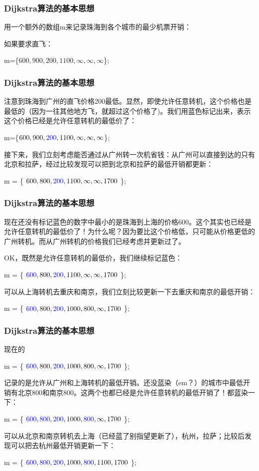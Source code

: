 \documentclass[CJK,14pt]{beamer}
\begin{document}
  \begin{frame}
    \frametitle{Dijkstra算法的基本思想}
    用一个额外的数组m来记录珠海到各个城市的最少机票开销：

    如果要求直飞：

    m=\{$600,900,200,1100,\infty,\infty,\infty$\};

      
    
  \end{frame}


  \begin{frame}
    \frametitle{Dijkstra算法的基本思想}
    注意到珠海到广州的直飞价格200最低。显然，即使允许任意转机，这个价格也是最低的（因为一往其他地方飞，就超过这个价格了)。我们用蓝色标记出来，表示这个价格已经是允许任意转机的最低价了：

    m=\{$600,900,{\color{blue} 200},1100,\infty,\infty,\infty$\};      

    接下来，我们立刻考虑能否通过从广州转一次机省钱：从广州可以直接到达的只有北京和拉萨，经过比较发现可以把到北京和拉萨的最低开销都更新：

    m = \{ $600, 800, {\color{blue} 200}, 1100, \infty, \infty, 1700$ \};

      
    
  \end{frame}


  \begin{frame}
    \frametitle{Dijkstra算法的基本思想}
    现在还没有标记蓝色的数字中最小的是珠海到上海的价格600。这个其实也已经是允许任意转机的最低价了！为什么呢？因为要比这个价格低，只可能从价格更低的广州转机。而从广州转机的价格我们已经考虑并更新过了。

    OK，既然是允许任意转机的最低价，我们继续标记蓝色：
    

    m = \{ ${\color{blue} 600}, 800, {\color{blue} 200}, 1100, \infty, \infty, 1700$ \};

    可以从上海转机去重庆和南京，我们立刻比较更新一下去重庆和南京的最低开销：

    m = \{ ${\color{blue} 600}, 800, {\color{blue} 200}, 1000, 800, \infty, 1700$ \};    
  \end{frame}


\begin{frame}
  \frametitle{Dijkstra算法的基本思想}
  现在的
  
  m = \{ ${\color{blue} 600}, 800, {\color{blue} 200}, 1000, 800, \infty, 1700$ \};

  记录的是允许从广州和上海转机的最低开销。还没蓝染（em？）的城市中最低开销有北京800和南京800。这两个也都已经是允许任意转机的最低开销了！都蓝染一下：
  
  m = \{ ${\color{blue} 600}, {\color{blue} 800}, {\color{blue} 200}, 1000, {\color{blue} 800}, \infty, 1700$ \};  

  可以从北京和南京转机去上海（已经蓝了别指望更新了），杭州，拉萨；比较后发现可以把去杭州最低开销更新一下：

    m = \{ ${\color{blue} 600}, {\color{blue} 800}, {\color{blue} 200}, 1000, {\color{blue} 800}, 1100, 1700$ \};  
  \end{frame}
    
\end{document}
